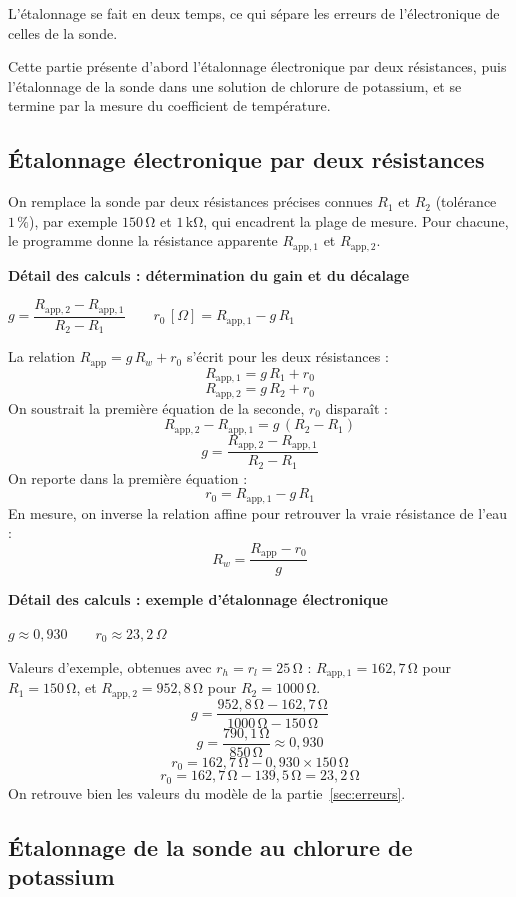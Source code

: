 \documentclass[11pt,a4paper]{article}
\newcommand{\resultat}[1]{\begin{center}{\large\color{bleuENO}$\displaystyle #1$}\end{center}}
\newenvironment{demo}[2]{\par\medskip\noindent\textbf{Détail des calculs : #1}\par\nopagebreak\resultat{#2}}{\par\medskip}
\newcommand{\calcul}[2]{\par\medskip\noindent\textbf{Détail des calculs : #1}\par\nopagebreak\resultat{#2}}
\newcommand{\U}[1]{\,\mathrm{#1}}
\begin{document}
L'étalonnage se fait en deux temps, ce qui sépare les erreurs de l'électronique de celles de la sonde.

Cette partie présente d'abord l'étalonnage électronique par deux résistances, puis l'étalonnage de la sonde dans une solution de chlorure de potassium, et se termine par la mesure du coefficient de température.

\subsection{Étalonnage électronique par deux résistances}

On remplace la sonde par deux résistances précises connues $R_1$ et $R_2$ (tolérance $1\U{\%}$), par exemple $150\U{\Omega}$ et $1\U{k\Omega}$, qui encadrent la plage de mesure. Pour chacune, le programme donne la résistance apparente $R_{\text{app},1}$ et $R_{\text{app},2}$.

\begin{demo}{détermination du gain et du décalage}{g = \dfrac{R_{\text{app},2} - R_{\text{app},1}}{R_2 - R_1} \qquad r_0\,[\Omega] = R_{\text{app},1} - g \, R_1}
La relation $R_{\text{app}} = g \, R_w + r_0$ s'écrit pour les deux résistances :
\[
R_{\text{app},1} = g \, R_1 + r_0
\]
\[
R_{\text{app},2} = g \, R_2 + r_0
\]
On soustrait la première équation de la seconde, $r_0$ disparaît :
\[
R_{\text{app},2} - R_{\text{app},1} = g \, (R_2 - R_1)
\]
\[
g = \frac{R_{\text{app},2} - R_{\text{app},1}}{R_2 - R_1}
\]
On reporte dans la première équation :
\[
r_0 = R_{\text{app},1} - g \, R_1
\]
En mesure, on inverse la relation affine pour retrouver la vraie résistance de l'eau :
\[
R_w = \frac{R_{\text{app}} - r_0}{g}
\]
\end{demo}

\calcul{exemple d'étalonnage électronique}{g \approx 0{,}930 \qquad r_0 \approx 23{,}2\,\Omega}
Valeurs d'exemple, obtenues avec $r_h = r_l = 25\U{\Omega}$ : $R_{\text{app},1} = 162{,}7\U{\Omega}$ pour $R_1 = 150\U{\Omega}$, et $R_{\text{app},2} = 952{,}8\U{\Omega}$ pour $R_2 = 1000\U{\Omega}$.
\[
g = \frac{952{,}8\U{\Omega} - 162{,}7\U{\Omega}}{1000\U{\Omega} - 150\U{\Omega}}
\]
\[
g = \frac{790{,}1\U{\Omega}}{850\U{\Omega}} \approx 0{,}930
\]
\[
r_0 = 162{,}7\U{\Omega} - 0{,}930 \times 150\U{\Omega}
\]
\[
r_0 = 162{,}7\U{\Omega} - 139{,}5\U{\Omega} = 23{,}2\U{\Omega}
\]
On retrouve bien les valeurs du modèle de la partie~\ref{sec:erreurs}.

\subsection{Étalonnage de la sonde au chlorure de potassium}
\end{document}
